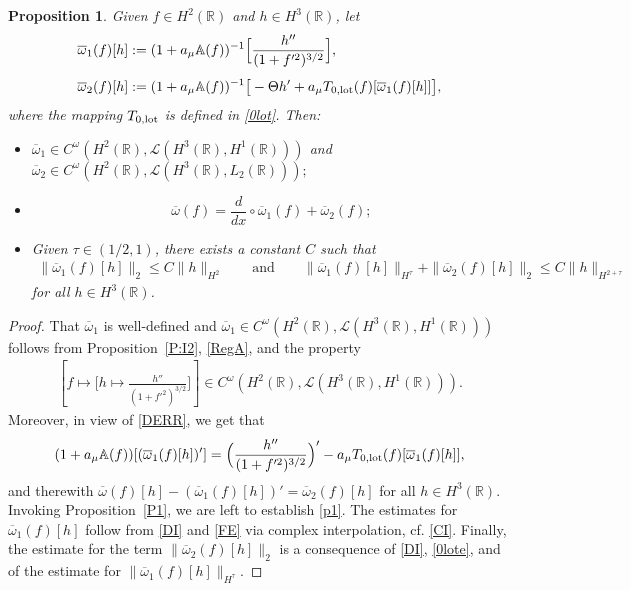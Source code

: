 \documentclass[11pt,reqno]{amsart}
\numberwithin{equation}{section}
\newcommand{\0}{\Omega}
\newcommand{\ov}{\overline}
\newcommand{\oo}{\ov\omega}
\newcommand{\bA}{\mathbb{A}}
\newcommand{\kL}{\mathcal{L}}
\newcommand{\R}{\mathbb{R}}
\newtheorem{prop}[thm]{Proposition}
\numberwithin{equation}{section}
\begin{document}
\begin{prop}\label{P1d} Given $f\in H^2(\R) $  and $h\in H^3(\R)$, let  
\begin{align*}
 \oo_1(f)[h]&:=(1+a_\mu\bA(f))^{-1}\Big[\frac{h''}{(1+f'^2)^{3/2}}\Big],\\[1ex]
 \oo_2(f)[h]&:=(1+a_\mu\bA(f))^{-1}\big[-\Theta h'+a_\mu T_{0,{\rm lot}}(f)[\oo_1(f)[h]]\big],
\end{align*}
where the mapping $T_{0,{\rm lot}} $ is defined in \eqref{0lot}. 
Then:
\begin{itemize}
 \item[$(i)$] $\oo_1\in C^\omega(H^2(\R), \kL(H^3(\R), H^1(\R)))$ and $  \oo_2\in C^\omega(H^2(\R), \kL(H^3(\R), L_2(\R)));$
 \item[$(ii)$] \[\oo(f)=\frac{d}{dx}\circ\oo_1(f)+\oo_2(f); \]
  \item[$(iii)$] Given $\tau\in (1/2,1)$, there exists a constant $C$ such that 
\begin{align}
\|\oo_1(f)[h]\|_2\leq C\|h\|_{H^2}\qquad\text{and}\qquad  \|\oo_1(f)[h]\|_{H^{\tau}}+\|\oo_2(f)[h]\|_2\leq C\|h\|_{H^{2+\tau}} \label{p1} 
\end{align}
for all $h\in H^3(\R)$.
\end{itemize}

\end{prop}
\begin{proof}
That $\oo_1$ is well-defined and $\oo_1\in C^\omega(H^2(\R), \kL(H^3(\R), H^1(\R))) $ follows from  Proposition~\ref{P:I2}, \eqref{RegA}, and the property
\begin{align*}
  \left[f\mapsto \Big[h\mapsto\frac{h''}{(1+f'^2)^{3/2}}\Big]\right]\in C^\omega(H^2(\R),\kL(H^3(\R),H^1(\R))).
 \end{align*}
 Moreover,   in view of \eqref{DERR}, we get that 
\begin{align}
(1+a_\mu\bA(f))[(\oo_1(f)[h])']=\Big(\frac{h''}{(1+f'^2)^{3/2}}\Big)'-a_\mu T_{0,{\rm lot}}(f)[\oo_1(f)[h]],\label{DEE}
\end{align}
 and therewith  $\oo(f)[h]-(\oo_1(f)[h])'=\oo_2(f)[h] $ for all $h\in H^3(\R)$.
Invoking Proposition~\ref{P1}, we are left  to establish \eqref{p1}.
The estimates for $ \oo_1(f)[h] $ follow from  \eqref{DI} and \eqref{FE} via complex interpolation, cf. \eqref{CI}.  
Finally, the estimate for the term $\|\oo_2(f)[h]\|_2$ is a consequence of \eqref{DI}, \eqref{0lote}, and of the  estimate  for $\|\oo_1(f)[h]\|_{H^{\tau}}.$
\end{proof}
\end{document}
